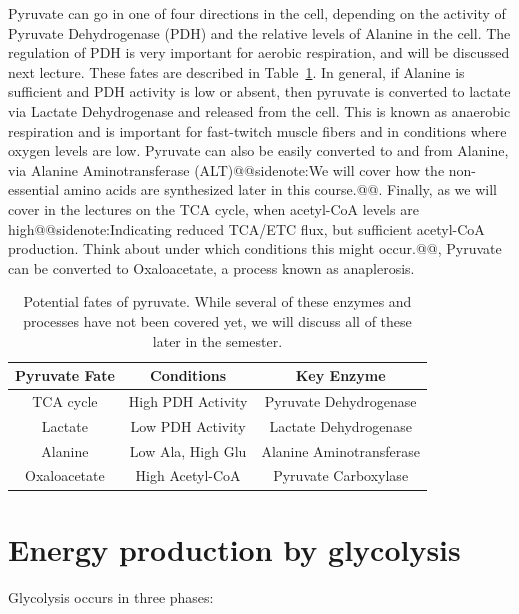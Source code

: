\documentclass{tufte-handout}
\makeatletter
\def\sidenote#1{@@sidenote:#1@@}
\makeatother
\begin{document}
Pyruvate can go in one of four directions in the cell, depending on the activity of Pyruvate Dehydrogenase (PDH) and the relative levels of Alanine in the cell.  The regulation of PDH is very important for aerobic respiration, and will be discussed next lecture.  These fates are described in Table~\ref{tab:pyruvate-fates}.  In general, if Alanine is sufficient and PDH activity is low or absent, then pyruvate is converted to lactate via Lactate Dehydrogenase and released from the cell.  This is known as anaerobic respiration and is important for fast-twitch muscle fibers and in conditions where oxygen levels are low.  Pyruvate can also be easily converted to and from Alanine, via Alanine Aminotransferase (ALT)\sidenote{We will cover how the non-essential amino acids are synthesized later in this course.}.  Finally, as we will cover in the lectures on the TCA cycle, when acetyl-CoA levels are high\sidenote{Indicating reduced TCA/ETC flux, but sufficient acetyl-CoA production.  Think about under which conditions this might occur.}, Pyruvate can be converted to Oxaloacetate, a process known as anaplerosis.
\\[0.6cm]

\begin{table}
\centering
\caption{Potential fates of pyruvate.  While several of these enzymes and processes have not been covered yet, we will discuss all of these later in the semester.}\label{tab:pyruvate-fates}
\begin{tabular}{ccc}
\hline
\textbf {Pyruvate Fate} & \textbf{Conditions}  & \textbf{Key Enzyme} \\
\hline
TCA cycle & High PDH Activity & Pyruvate Dehydrogenase \\
Lactate & Low PDH Activity & Lactate Dehydrogenase \\
Alanine & Low Ala, High Glu & Alanine Aminotransferase\\
Oxaloacetate & High Acetyl-CoA & Pyruvate Carboxylase \\
\hline
\end{tabular}
\end{table}

\section{Energy production by glycolysis}

Glycolysis occurs in three phases:
\end{document}
